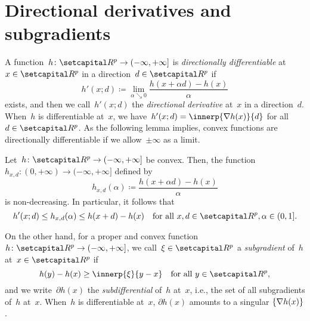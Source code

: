 \documentclass[../main]{subfiles}
\begin{document}
\section{Directional derivatives and subgradients}
A function~$h \colon \setR^p \to (-\infty, +\infty]$ is \emph{directionally differentiable} at~$x \in \setR^p$ in a direction~$d \in \setR^p$ if
\[ \label{eq:dir_deriv}
    h'(x; d) \coloneqq \lim_{\alpha \searrow 0} \frac{h(x + \alpha d) - h(x)}{\alpha}
\] 
exists, and then we call~$h'(x; d)$ the \emph{directional derivative} at~$x$ in a direction~$d$.
When~$h$ is differentiable at~$x$, we have~$h'(x; d) = \innerp{\nabla h(x)}{d}$ for all~$d \in \setR^p$.
As the following lemma implies, convex functions are directionally differentiable if we allow~$\pm \infty$ as a limit.
\begin{lemma} \label{thm:nondecreasing}
    Let~$h \colon \setR^p \to (-\infty, +\infty]$ be convex.
    Then, the function~$h_{x, d} \colon (0, +\infty) \to (-\infty, +\infty]$ defined by
    \[
        h_{x, d}(\alpha) \coloneqq \frac{h(x + \alpha d) - h(x)}{\alpha}
    \] 
    is non-decreasing.
    In particular, it follows that
    \[
        h'(x; d) \le h_{x, d}(\alpha) \le h(x + d) - h(x) \forallcondition{x, d \in \setR^p, \alpha \in (0, 1]}
    .\] 
\end{lemma}
On the other hand, for a proper and convex function~$h \colon \setR^p \to (-\infty, +\infty]$, we call~$\xi \in \setR^p$ a \emph{subgradient} of~$h$ at~$x \in \setR^p$ if
\[ \label{eq:subgrad}
    h(y) - h(x) \ge \innerp{\xi}{y - x} \forallcondition{y \in \setR^p}
,\] 
and we write~$\partial h(x)$ the \emph{subdifferential} of~$h$ at~$x$, i.e., the set of all subgradients of~$h$ at~$x$.
When~$h$ is differentiable at~$x$, $\partial h(x)$ amounts to a singular $\lbrace\nabla h(x)\rbrace$.
\end{document}
